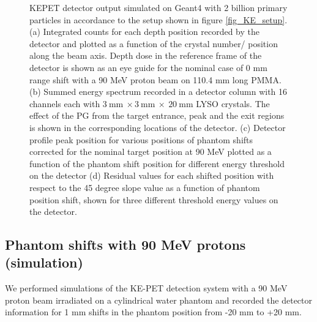 \documentclass[11pt,a4paper]{article}
\begin{document}
\begin{figure}[h]
\caption{KEPET detector output simulated on Geant4 with 2 billion primary particles in accordance to the setup shown in figure \ref{fig_KE_setup}. (a) Integrated counts for each depth position recorded by the detector and plotted as a function of the crystal number/ position along the beam axis. Depth dose in the reference frame of the detector is shown as an eye guide for the nominal case of 0 mm range shift with a 90 MeV proton beam on 110.4 mm long PMMA. (b) Summed energy spectrum recorded in a detector column with 16 channels each  with $\mathrm{3\ mm\ \times 3\ mm\ \times\ 20\ mm}$ LYSO crystals. The effect of the PG from the target entrance, peak and the exit regions is shown in the corresponding locations of the detector. (c) Detector profile peak position for various positions of phantom shifts corrected for the nominal target position at  90 MeV plotted as a function of the phantom shift position for different energy threshold on the detector (d) Residual values for each shifted position with respect to the 45 degree slope value as a function of phantom position shift, shown for three different threshold energy values on the detector.}
\label{fig_KE_depth}
\end{figure}

\subsection{Phantom shifts with 90 MeV protons (simulation)}
We performed simulations of the KE-PET detection system with a 90 MeV proton beam irradiated on a cylindrical water phantom and recorded the detector information for 1 mm shifts in the phantom position from -20 mm to +20 mm. 
\end{document}
